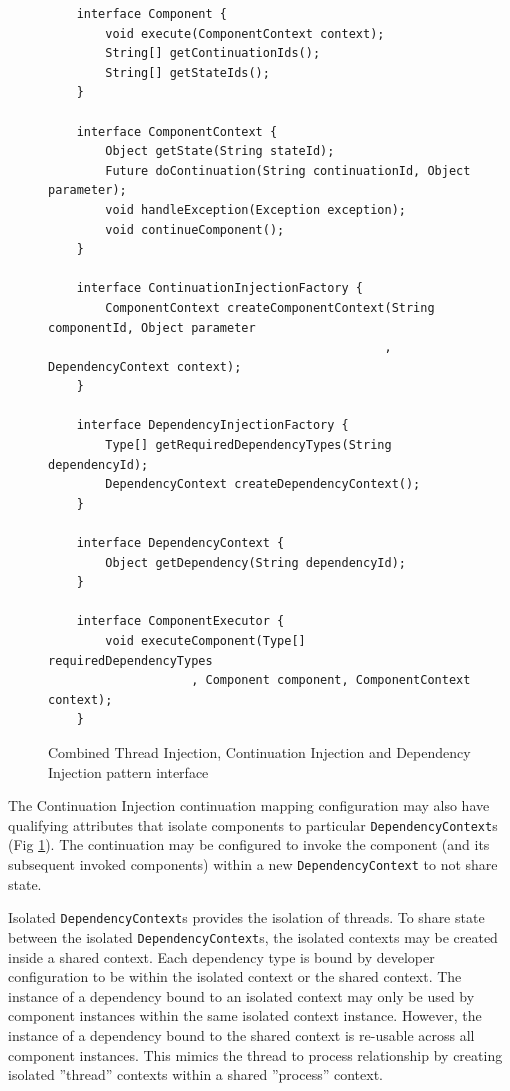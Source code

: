 \documentclass[prodmode]{style/acmlarge}
\begin{document}
\begin{figure}[tp]
\centering
\begin{verbatim}
    interface Component {
        void execute(ComponentContext context);
        String[] getContinuationIds();
        String[] getStateIds();
    }

    interface ComponentContext {
        Object getState(String stateId);
        Future doContinuation(String continuationId, Object parameter);
        void handleException(Exception exception);
        void continueComponent();
    }
    
    interface ContinuationInjectionFactory {
        ComponentContext createComponentContext(String componentId, Object parameter
                                               , DependencyContext context);
    }
    
    interface DependencyInjectionFactory {
        Type[] getRequiredDependencyTypes(String dependencyId);
        DependencyContext createDependencyContext();
    }
    
    interface DependencyContext {
        Object getDependency(String dependencyId);
    }

    interface ComponentExecutor {
        void executeComponent(Type[] requiredDependencyTypes
                    , Component component, ComponentContext context);
    }
\end{verbatim}
\caption{Combined Thread Injection, Continuation Injection and Dependency Injection pattern interface\footnotemark}
\label{fig:IocInjectionInterfaces}
\end{figure}


The Continuation Injection continuation mapping configuration may also have
qualifying attributes that isolate components to particular
\texttt{DependencyContext}s (Fig \ref{fig:IocInjectionInterfaces}).  The
continuation may be configured to invoke the component (and its subsequent
invoked components) within a new \texttt{DependencyContext} to not share state.

Isolated \texttt{DependencyContext}s provides the isolation of threads.  To
share state between the isolated \texttt{Depend\-ency\-Context}s, the isolated
contexts may be created inside a shared context.  Each dependency type is bound
by developer configuration to be within the isolated context or the shared
context.  The instance of a dependency bound to an isolated context may only be
used by component instances within the same isolated context instance.  However,
the instance of a dependency bound to the shared context is re-usable across all
component instances.  This mimics the thread to process relationship by creating
isolated ''thread'' contexts within a shared ''process'' context.
\end{document}
